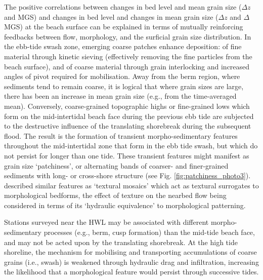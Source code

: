 The positive correlations between changes in bed level and mean grain size ($\Delta z$ and MGS) and changes in bed level and changes in mean grain size ($\Delta z$ and $\Delta$MGS) at the beach surface can be explained in terms of mutually reinforcing feedbacks between flow, morphology, and the surficial grain size distribution. In the ebb-tide swash zone, emerging coarse patches enhance deposition: of fine material through kinetic sieving (effectively removing the fine particles from the beach surface), and of coarse material through grain interlocking and increased angles of pivot required for mobilisation. Away from the berm region, where sediments tend to remain coarse, it is logical that where grain sizes are large, there has been an increase in mean grain size (e.g., from the time-averaged mean). Conversely, coarse-grained topographic highs or fine-grained lows which form on the mid-intertidal beach face during the previous ebb tide are subjected to the destructive influence of the translating shorebreak during the subsequent flood. The result is the formation of transient morpho-sedimentary features throughout the mid-intertidal zone that form in the ebb tide swash, but which do not persist for longer than one tide. These transient features might manifest as grain size `patchiness', or alternating bands of coarser- and finer-grained sediments with long- or cross-shore structure (see Fig. \ref{fig:patchiness_photo3}). \citet{Buscombe_Masselink2006} described similar features as `textural mosaics' which act as textural surrogates to morphological bedforms, the effect of texture on the nearbed flow being considered in terms of its `hydraulic equivalence' to morphological patterning.

Stations surveyed near the HWL may be associated with different morpho-sedimentary processes (e.g., berm, cusp formation) than the mid-tide beach face, and may not be acted upon by the translating shorebreak. At the high tide shoreline, the mechanism for mobilising and transporting accumulations of coarse grains (i.e., swash) is weakened through hydraulic drag and infiltration, increasing the likelihood that a morphological feature would persist through successive tides.



